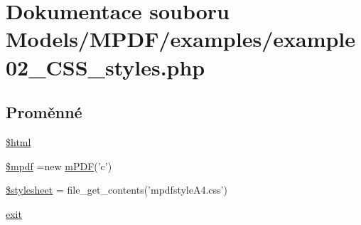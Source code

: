 \hypertarget{example02___c_s_s__styles_8php}{\section{Dokumentace souboru Models/\-M\-P\-D\-F/examples/example02\-\_\-\-C\-S\-S\-\_\-styles.php}
\label{example02___c_s_s__styles_8php}
}
\subsection*{Proměnné}
\begin{DoxyCompactItemize}
\item 
\hyperlink{example02___c_s_s__styles_8php_a6f96e7fc92441776c9d1cd3386663b40}{\$html}
\item 
\hyperlink{example02___c_s_s__styles_8php_ad028f81910d6cbab9b184d2214b3a8f8}{\$mpdf} =new \hyperlink{classm_p_d_f}{m\-P\-D\-F}('c')
\item 
\hyperlink{example02___c_s_s__styles_8php_a19e5cf73e817c55a49205e6ec78c88a8}{\$stylesheet} = file\-\_\-get\-\_\-contents('mpdfstyle\-A4.\-css')
\item 
\hyperlink{example02___c_s_s__styles_8php_a6733eb5f605d09eaede9845835d71c4e}{exit}
\end{DoxyCompactItemize}


